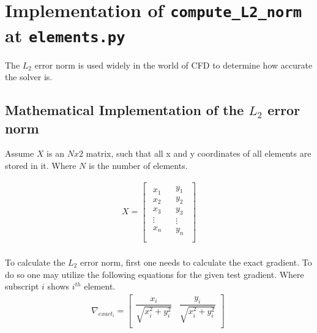 \documentclass[a4paper, 12pt]{article}
\begin{document}
\section{Implementation of \texttt{compute\_L2\_norm} at \texttt{elements.py}}
The $L_2$ error norm is used widely in the world of CFD to determine how accurate the solver is.
\subsection{Mathematical Implementation of the $L_2$ error norm}
Assume \(X\) is an \(Nx\textit{2}\) matrix, such that all x and y coordinates of
all elements are stored in it. Where $N$ is the number of elements.

\begin{equation}
\begin{matrix}
X = \begin{bmatrix}
\begin{matrix}
x_{1} \\
x_{2} \\
x_{3} \\
\vdots \\
x_n
\end{matrix} & \begin{matrix}
y_{1} \\
y_{2} \\
y_{3} \\
\vdots \\
y_n
\end{matrix} \\
\end{bmatrix} \\
\end{matrix}
\end{equation}

To calculate the \(L_{2}\) error norm, first one needs to calculate the exact gradient. To do so one may utilize the following equations for the given test gradient. Where subscript $i$ shows \(i^{th}\) element.
\begin{equation}
\begin{matrix}
\nabla_{exact_{i}} = \begin{bmatrix}
\dfrac{x_{i}}{\sqrt{x_{i}^{2} + y_{i}^{2}}} & \dfrac{y_{i}}{\sqrt{x_{i}^{2} + y_{i}^{2}}} \\
\end{bmatrix}\  \\
\end{matrix}
\end{equation}
\end{document}
